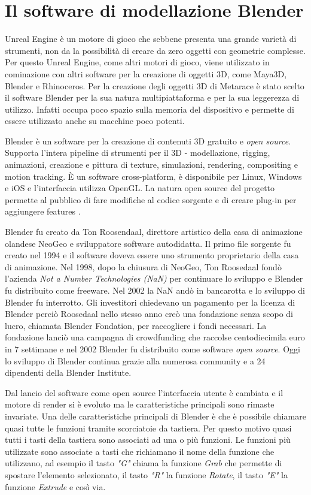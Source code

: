 \section{Il software di modellazione Blender}

Unreal Engine è un motore di gioco che sebbene presenta una grande varietà di strumenti, non da la possibilità di creare da zero oggetti con geometrie complesse.
%
Per questo Unreal Engine, come altri motori di gioco, viene utilizzato in cominazione con altri software per la creazione di oggetti 3D, come Maya3D, Blender e Rhinoceros.
%
Per la creazione degli oggetti 3D di Metarace è stato scelto il software Blender per la sua natura multipiattaforma e per la sua leggerezza di utilizzo.
%
Infatti occupa poco spazio sulla memoria del dispositivo e permette di essere utilizzato anche su macchine poco potenti.

Blender è un software per la creazione di contenuti 3D gratuito e \textit{open source}.
%
Supporta l'intera pipeline di strumenti per il 3D - modellazione, rigging, animazioni, creazione e pittura di texture, simulazioni, rendering, compositing e motion tracking.
%
È un software cross-platform, è disponibile per Linux, Windows e iOS e l'interfaccia utilizza OpenGL.
%
La natura open source del progetto permette al pubblico di fare modifiche al codice sorgente e di creare plug-in per aggiungere features \cite{BlenderAbout}.

Blender fu creato da Ton Roosendaal, direttore artistico della casa di animazione olandese NeoGeo e sviluppatore software autodidatta. 
%
Il primo file sorgente fu creato nel 1994 e il software doveva essere uno strumento proprietario della casa di animazione.
%
Nel 1998, dopo la chiusura di NeoGeo, Ton Roosedaal fondò l'azienda \textit{Not a Number Technologies (NaN)} per continuare lo sviluppo e Blender fu distribuito come freeware. 
%
Nel 2002 la NaN andò in bancarotta e lo sviluppo di Blender fu interrotto.
%
Gli investitori chiedevano un pagamento per la licenza di Blender perciò Roosedaal nello stesso anno creò una fondazione senza scopo di lucro, chiamata Blender Fondation, per raccogliere i fondi necessari.
%
La fondazione lanciò una campagna di crowdfunding che raccolse centodiecimila euro in 7 settimane e nel 2002 Blender fu distribuito come software \textit{open source}.
%
Oggi lo sviluppo di Blender continua grazie alla numerosa community e a 24 dipendenti della Blender Institute.

Dal lancio del software come open source l'interfaccia utente è cambiata e il motore di render si è evoluto ma le caratteristiche principali sono rimaste invariate.
%
Una delle caratteristiche principali di Blender è che è possibile chiamare quasi tutte le funzioni tramite scorciatoie da tastiera. 
%
Per questo motivo quasi tutti i tasti della tastiera sono associati ad una o più funzioni. 
%
Le funzioni più utilizzate sono associate a tasti che richiamano il nome della funzione che utilizzano, ad esempio il tasto \textit{"G"} chiama la funzione \textit{Grab} che permette di spostare l'elemento selezionato, il tasto \textit{"R"} la funzione \textit{Rotate}, il tasto \textit{"E"} la funzione \textit{Extrude} e così via.

